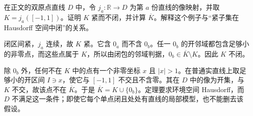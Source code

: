 \begin{exercise}\label{g1:ex:double-origin-compact}
	在正文的双原点直线 \(D\) 中，令 \(j_a:\mathbb R\to D\) 为第 \(a\) 份直线的像映射，并取 \(K=j_a([-1,1])\)。证明 \(K\) 紧而不闭，并计算 \(\overline K\)。解释这个例子与“紧子集在 Hausdorff 空间中闭”的关系。
\end{exercise}
\begin{solution}
	闭区间紧，\(j_a\) 连续，故 \(K\) 紧。它含 \(0_a\) 而不含 \(0_b\)。任一 \(0_b\) 的开邻域都包含足够小的非零点，而这些点属于 \(K\)，所以由闭包的邻域判据，\(0_b\in\overline K\setminus K\)。因此 \(K\) 不闭。

	除 \(0_b\) 外，任何不在 \(K\) 中的点有一个非零坐标 \(x\) 且 \(|x|>1\)。在普通实直线上取足够小的开区间 \(I\ni x\)，使它与 \([-1,1]\) 不交且不含零。其在 \(D\) 中的像为开集，与 \(K\) 不交，故该点不在 \(\overline K\)。于是 \(\overline K=K\cup\{0_b\}\)。定理要求环境空间 Hausdorff，而 \(D\) 不满足这一条件；即使它每个单点闭且处处有直线的局部模型，也不能删去该假设。
\end{solution}
